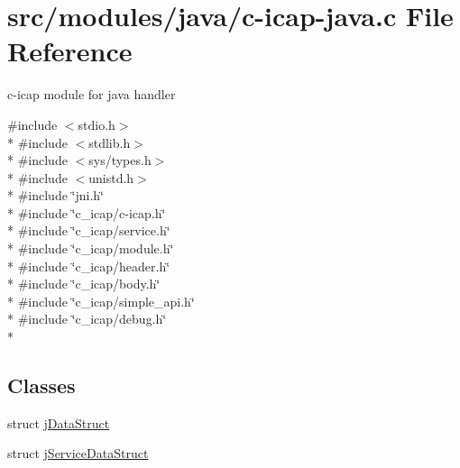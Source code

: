 \hypertarget{c-icap-java_8c}{\section{src/modules/java/c-\/icap-\/java.c File Reference}
\label{c-icap-java_8c}
}


c-\/icap module for java handler  


{\ttfamily \#include $<$stdio.\+h$>$}\\*
{\ttfamily \#include $<$stdlib.\+h$>$}\\*
{\ttfamily \#include $<$sys/types.\+h$>$}\\*
{\ttfamily \#include $<$unistd.\+h$>$}\\*
{\ttfamily \#include \char`\"{}jni.\+h\char`\"{}}\\*
{\ttfamily \#include \char`\"{}c\+\_\+icap/c-\/icap.\+h\char`\"{}}\\*
{\ttfamily \#include \char`\"{}c\+\_\+icap/service.\+h\char`\"{}}\\*
{\ttfamily \#include \char`\"{}c\+\_\+icap/module.\+h\char`\"{}}\\*
{\ttfamily \#include \char`\"{}c\+\_\+icap/header.\+h\char`\"{}}\\*
{\ttfamily \#include \char`\"{}c\+\_\+icap/body.\+h\char`\"{}}\\*
{\ttfamily \#include \char`\"{}c\+\_\+icap/simple\+\_\+api.\+h\char`\"{}}\\*
{\ttfamily \#include \char`\"{}c\+\_\+icap/debug.\+h\char`\"{}}\\*
\subsection*{Classes}
\begin{DoxyCompactItemize}
\item 
struct \hyperlink{structj_data_struct}{j\+Data\+Struct}
\item 
struct \hyperlink{structj_service_data_struct}{j\+Service\+Data\+Struct}
\end{DoxyCompactItemize}
